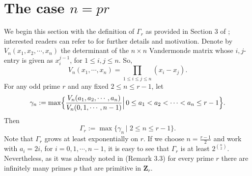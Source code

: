 \documentclass[10pt,a4paper]{amsart}
\def\Z{\mathbf{Z}}
\begin{document}
\section{ The case $n=pr $  }\label{Sec:n=pr}

We begin this section  with the definition of $\Gamma_r$ as provided in Section 3 of \cite{Zhang}; interested readers can refer to \cite{Zhang} for further details and motivation.
Denote by $V_n(x_1, x_2, \cdots, x_n)$ the  determinant of the $n\times n$ Vandermonde matrix whose $i, j$-entry is given as $x_i^{j-1}$,  for $1 \leq i, j \leq n$. So, 
\[
V_n(x_1, \cdots, x_n)= \prod_{1 \leq i \leq j \leq n} (x_i - x_j).
\]
For any odd prime $r$ and any  fixed $2 \leq n \leq r-1$, let 
\[
\gamma_n:= \max \Bigl\{ \frac{V_n(a_1, a_2, \cdots, a_n)}{V_n(0,1,\cdots,n-1) } \Big| \, 0 \leq a_1 <a_2 < \cdots <a_n \leq r-1 \Bigr\}.
\]
Then 
\[
\Gamma_r := \max \big\{ \gamma_n \, \big|  \, \, 2 \leq n \leq r-1 \big\}.
\]
Note that $\Gamma_r$ grows at least exponentially on $r$. If we choose $n=\frac{r-1}{2}$ and work with $a_i = 2i$,  for $i=0,1, \cdots  , n-1$,  
it is easy to see that $\Gamma_r$ is at least $2^{n \choose 2}$.
Nevertheless, as it was already noted in \cite{Zhang} (Remark 3.3)   for every prime $r$ there are infinitely many primes $p$ that are primitive in $\Z_r$. 
\end{document}
